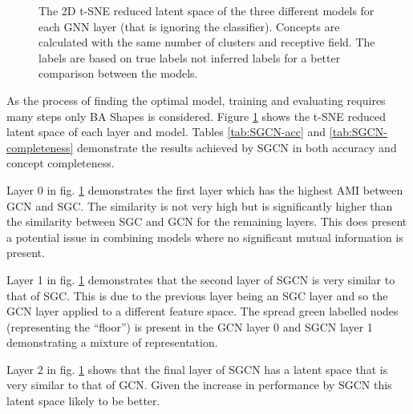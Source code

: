\begin{figure}
    \caption{The 2D t-SNE reduced latent space of the three different models for each GNN layer (that is ignoring the classifier). Concepts are calculated with the same number of clusters and receptive field. The labels are based on true labels not inferred labels for a better comparison between the models.}
    \label{fig:SGCN-latent-spaces}
\end{figure}




As the process of finding the optimal model, training and evaluating requires many steps only BA Shapes is considered.
Figure \ref{fig:SGCN-latent-spaces} shows the t-SNE reduced latent space of each layer and model.
Tables \ref{tab:SGCN-acc} and \ref{tab:SGCN-completeness} demonstrate the results achieved by SGCN in both accuracy and concept completeness.

Layer 0 in fig. \ref{fig:SGCN-latent-spaces} demonstrates the first layer which has the highest AMI between GCN and SGC.
The similarity is not very high but is significantly higher than the similarity between SGC and GCN for the remaining layers.
This does present a potential issue in combining models where no significant mutual information is present.

Layer 1 in fig. \ref{fig:SGCN-latent-spaces} demonstrates that the second layer of SGCN is very similar to that of SGC.
This is due to the previous layer being an SGC layer and so the GCN layer applied to a different feature space.
The spread green labelled nodes (representing the ``floor'') is present in the GCN layer 0 and SGCN layer 1 demonstrating a mixture of representation.

Layer 2 in fig. \ref{fig:SGCN-latent-spaces} shows that the final layer of SGCN has a latent space that is very similar to that of GCN.
Given the increase in performance by SGCN this latent space likely to be better.

